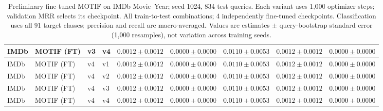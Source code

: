 \begin{table}[htbp]
\begin{adjustbox}{max width=\linewidth}
\begin{tabular}{|l|l|l|l|l|l|l|l|l|}
\hline
IMDb & MOTIF (FT) & v3 & v4 & $0.0012 \pm 0.0012$ & $0.0000 \pm 0.0000$ & $0.0110 \pm 0.0053$ & $0.0012 \pm 0.0012$ & $0.0000 \pm 0.0000$ \\
\hline
IMDb & MOTIF (FT) & v4 & v1 & $0.0012 \pm 0.0012$ & $0.0000 \pm 0.0000$ & $0.0110 \pm 0.0053$ & $0.0012 \pm 0.0012$ & $0.0000 \pm 0.0000$ \\
\hline
IMDb & MOTIF (FT) & v4 & v2 & $0.0012 \pm 0.0012$ & $0.0000 \pm 0.0000$ & $0.0110 \pm 0.0053$ & $0.0012 \pm 0.0012$ & $0.0000 \pm 0.0000$ \\
\hline
IMDb & MOTIF (FT) & v4 & v3 & $0.0012 \pm 0.0012$ & $0.0000 \pm 0.0000$ & $0.0110 \pm 0.0053$ & $0.0012 \pm 0.0012$ & $0.0000 \pm 0.0000$ \\
\hline
IMDb & MOTIF (FT) & v4 & v4 & $0.0012 \pm 0.0012$ & $0.0000 \pm 0.0000$ & $0.0110 \pm 0.0053$ & $0.0012 \pm 0.0012$ & $0.0000 \pm 0.0000$ \\
\hline
\end{tabular}
\end{adjustbox}
\caption{Preliminary fine-tuned MOTIF on IMDb Movie--Year; seed 1024, 834 test queries. Each variant uses 1,000 optimizer steps; validation MRR selects its checkpoint. All train-to-test combinations; 4 independently fine-tuned checkpoints. Classification uses all 91 target classes; precision and recall are macro-averaged. Values are estimates $\pm$ query-bootstrap standard error (1,000 resamples), not variation across training seeds.}
\label{tab:motif-imdb-movie-year-matrix-classification-all}
\end{table}
